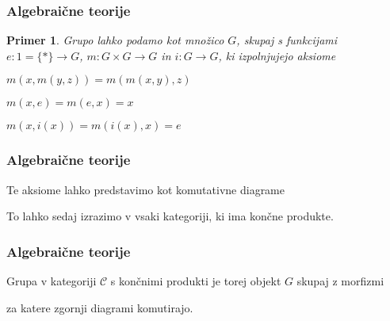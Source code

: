 \documentclass{beamer}
\newtheorem{primer}{Primer}
\begin{document}
\begin{frame}[fragile]
\frametitle{Algebraične teorije}
\begin{primer}
Grupo lahko podamo kot množico $G$, skupaj s funkcijami $e : 1 = \lbrace * \rbrace \to G$, $m : G \times G \to G$ in $i : G \to G$, ki izpolnjujejo aksiome
\begin{description}
\item $m(x,m(y,z)) = m(m(x,y),z)$
\item $m(x,e) = m(e,x) = x$
\item $m(x,i(x)) = m(i(x),x) = e$
\end{description}
\end{primer}
\end{frame}

\begin{frame}[fragile]
\frametitle{Algebraične teorije}
Te aksiome lahko predstavimo kot komutativne diagrame
\begin{center}
\end{center}
\begin{center}
\end{center}
\begin{center}
\end{center}
\pause
To lahko sedaj izrazimo v vsaki kategoriji, ki ima končne produkte.
\end{frame}

\begin{frame}[fragile]
\frametitle{Algebraične teorije}
Grupa v kategoriji $\mathcal{C}$ s končnimi produkti je torej objekt $G$ skupaj z morfizmi
\begin{center}
\end{center}
za katere zgornji diagrami komutirajo.
\end{frame}
\end{document}

